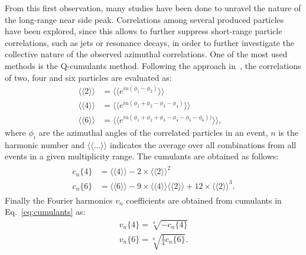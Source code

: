From this first observation, many studies have been done to unravel the nature of the 
long-range near side peak. Correlations among several produced particles have been explored, 
since this allows to further suppress short-range particle correlations, 
such as jets or resonance decays, in order to further investigate the collective nature 
of the observed azimuthal correlations. One of the most used methods is the 
Q-cumulants method. Following the approach in~\cite{Bilandzic:2010jr}, the 
correlations of two, four and six particles are evaluated as:
\begin{equation}
\label{correlations}
\begin{aligned}
\langle \langle 2 \rangle \rangle &= \langle \langle e^{in(\phi_1 -\phi_2)} \rangle \rangle &\\
\langle \langle 4 \rangle \rangle &= \langle \langle e^{in(\phi_1 + \phi_2 -\phi_3 - \phi_4)} \rangle \rangle &\\
\langle \langle 6 \rangle \rangle &= \langle \langle e^{in(\phi_1 + \phi_2 +\phi_3 - \phi_4- \phi_5- \phi_6))} \rangle \rangle,&
\end{aligned}
\end{equation}
where $\phi_i$ are the azimuthal angles of the correlated particles in an event, $n$ is the harmonic number and $\langle \langle ... \rangle \rangle$ indicates the average over all combinations from all events in a given multiplicity range. The cumulants are obtained as follows:
\begin{equation}
\label{eq:cumulants}
\begin{aligned}
\begin{split}
c_n\{4\} &= \langle \langle 4 \rangle \rangle - 2 \times  \langle \langle 2 \rangle \rangle^2 \\
c_n\{6\} &= \langle \langle 6 \rangle \rangle - 9 \times  \langle \langle 4 \rangle \rangle \langle \langle 2 \rangle \rangle + 12 \times \langle \langle 2 \rangle \rangle^3.
\end{split}
\end{aligned}
\end{equation}
Finally the Fourier harmonics $v_n$ coefficients are obtained from cumulants in Eq.~\ref{eq:cumulants} as:
\begin{equation}
\begin{aligned}
v_n \{4\} = \sqrt[4]{-c_n\{4\}} \\
v_n \{6\} = \sqrt[6]{\frac{1}{4}c_n\{6\}}.
\end{aligned}
\end{equation}
